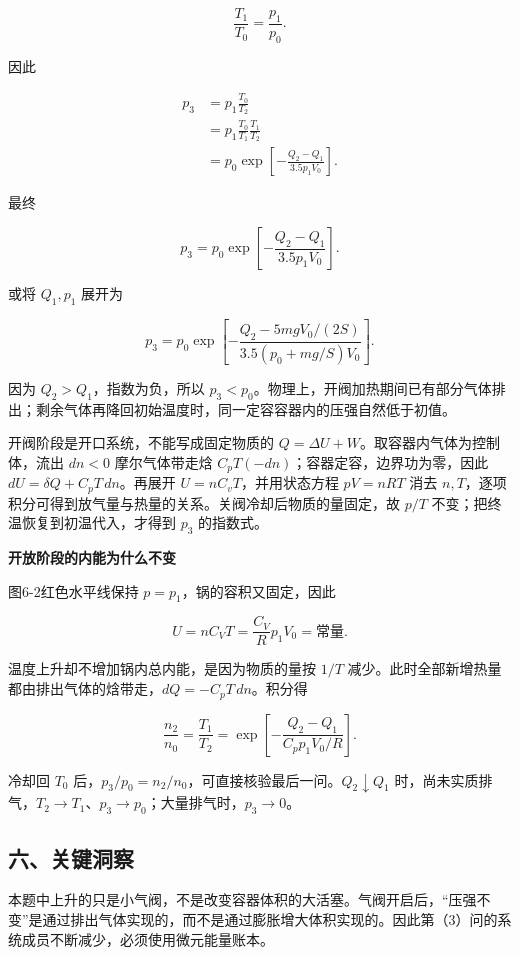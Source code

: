 \documentclass[12pt,a4paper,UTF8]{ctexart}
\begin{document}
\[\frac{T_1}{T_0}=\frac{p_1}{p_0}.\]

因此

\[\begin{aligned}
p_3
&=p_1\frac{T_0}{T_2}\\
&=p_1\frac{T_0}{T_1}\frac{T_1}{T_2}\\
&=p_0\exp\left[-\frac{Q_2-Q_1}{3.5p_1V_0}\right].
\end{aligned}\]

最终

\[\boxed{
p_3=p_0\exp\left[-\frac{Q_2-Q_1}{3.5p_1V_0}\right]
}.\]

或将 \(Q_1,p_1\) 展开为

\[\boxed{
p_3=p_0\exp\left[
-\frac{Q_2-5mgV_0/(2S)}
{3.5\left(p_0+mg/S\right)V_0}
\right]
}.\]

因为 \(Q_2>Q_1\)，指数为负，所以
\(p_3<p_0\)。物理上，开阀加热期间已有部分气体排出；剩余气体再降回初始温度时，同一定容容器内的压强自然低于初值。

开阀阶段是开口系统，不能写成固定物质的
\(Q=\Delta U+W\)。取容器内气体为控制体，流出 \(dn<0\) 摩尔气体带走焓
\(C_pT(-dn)\)；容器定容，边界功为零，因此
\(dU=\delta Q+C_pT\,dn\)。再展开 \(U=nC_vT\)，并用状态方程 \(pV=nRT\)
消去
\(n,T\)，逐项积分可得到放气量与热量的关系。关阀冷却后物质的量固定，故
\(p/T\) 不变；把终温恢复到初温代入，才得到 \(p_3\) 的指数式。

\textbf{开放阶段的内能为什么不变}

图6-2红色水平线保持 \(p=p_1\)，锅的容积又固定，因此

\[U=nC_VT=\frac{C_V}{R}p_1V_0=\text{常量}.\]

温度上升却不增加锅内总内能，是因为物质的量按 \(1/T\)
减少。此时全部新增热量都由排出气体的焓带走，\(dQ=-C_pT\,dn\)。积分得

\[\frac{n_2}{n_0}=\frac{T_1}{T_2}
=\exp\left[-\frac{Q_2-Q_1}{C_pp_1V_0/R}\right].\]

冷却回 \(T_0\)
后，\(p_3/p_0=n_2/n_0\)，可直接核验最后一问。\(Q_2\downarrow Q_1\)
时，尚未实质排气，\(T_2\to T_1\)、\(p_3\to p_0\)；大量排气时，\(p_3\to0\)。

\subsection{六、关键洞察}\label{ux516dux5173ux952eux6d1eux5bdf-5}

本题中上升的只是小气阀，不是改变容器体积的大活塞。气阀开启后，``压强不变''是通过排出气体实现的，而不是通过膨胀增大体积实现的。因此第（3）问的系统成员不断减少，必须使用微元能量账本。
\end{document}
